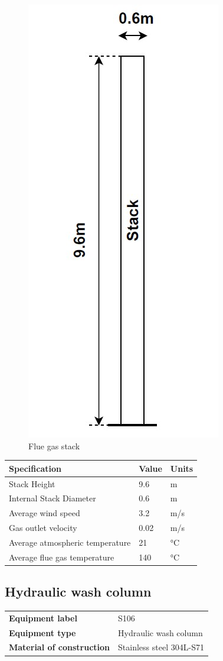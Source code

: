 \begin{figure}[H]
    \centering
    \includegraphics[width=0.3\linewidth]{chapters/Z-support/figures/Flue gas stack.jpg}
    \caption{Flue gas stack}
\end{figure}


\begin{table}[H]
\centering

\begin{tabular}{@{}l|l|l@{}}
\toprule
\textbf{Specification}          & \textbf{Value}      & \textbf{Units} \\ \midrule
Stack Height                    & 9.6                 & m              \\
Internal Stack Diameter         & 0.6                 & m              \\
Average wind speed              & 3.2                 & m/s            \\
Gas outlet velocity             & 0.02                & m/s            \\
Average atmospheric temperature & 21                  & °C             \\
Average flue gas temperature    & 140                 & °C             \\ \bottomrule
           
\end{tabular}
\end{table}


\newpage
\subsection{Hydraulic wash column}

\begin{table}[H]
    \centering
    \begin{tabular}{@{}l|l@{}}
    \toprule
      \textbf{Equipment label}  & S106\\
       \textbf{Equipment type}  & Hydraulic wash column \\
       \textbf{Material of construction} & Stainless steel 304L-S71 \\
       \bottomrule
    \end{tabular}
\end{table}


